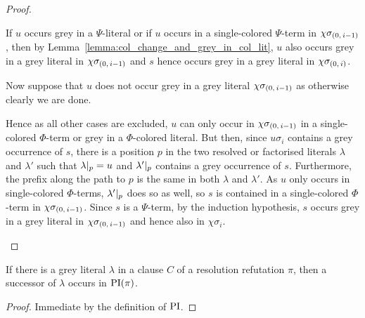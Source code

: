 \documentclass[,%
	draft=false,%
	numbers=noendperiod
	12pt,
	a4paper,
	oneside,%
	openany,
]{memoir}
\newcommand{\inv}{\ensuremath{\chi}}
\begin{document}
\begin{proof}
\begin{itemize}
			If $u$ occurs grey in a $\Psi$-literal or
			if $u$ occurs in a single-colored $\Psi$-term in $\inv\sigmazmi$, then by Lemma~\ref{lemma:col_change_and_grey_in_col_lit}, $u$ also occurs grey in a grey literal in $\inv\sigmazmi$ and $s$ hence occurs grey in a grey literal in $\inv\sigmazi$. 

			Now suppose that $u$ does not occur grey in a grey literal $\inv\sigmazmi$ as otherwise clearly we are done.

			Hence as all other cases are excluded, $u$ can only occur in $\inv\sigmazmi$ in a single-colored $\Phi$-term or grey in a $\Phi$-colored literal.
			But then, 
			since $u\sigma_i$ contains a grey occurrence of $s$, there is a position $p$ in the two resolved or factorised literals $\lambda$ and $\lambda'$ such that $\lambda|_{p} = u$ and $\lambda'|_{p}$ contains a grey occurrence of $s$.
			Furthermore, the prefix along the path to $p$ is the same in both $\lambda$ and $\lambda'$.
			As $u$ only occurs in single-colored $\Phi$-terms, $\lambda'|_{p}$ does so as well, so $s$ is contained in a single-colored $\Phi$-term in $\inv\sigmazmi$.
			Since $s$ is a $\Psi$-term, by the induction hypothesis, $s$ occurs grey in a grey literal in $\inv\sigmazmi$ and hence also in $\inv\sigma_i$.
			\qedhere
	\end{itemize}

\end{proof}

\begin{lemma}
	\label{lemma:grey_lits_all_in_PI}
	If there is a grey literal $\lambda$ in a clause $C$ of a resolution refutation $\pi$,
	then a successor of $\lambda$ occurs in $\operatorname{PI}(\pi)$.
\end{lemma}
\begin{proof}
	Immediate by the definition of $\operatorname{PI}$.
\end{proof}


\end{document}
